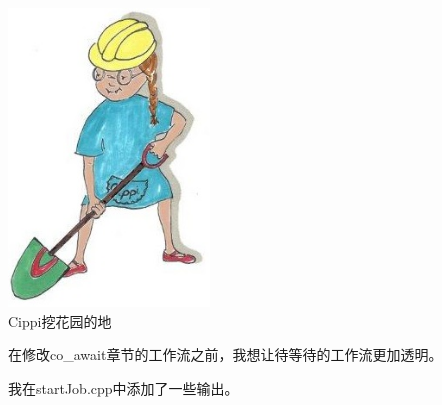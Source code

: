 \begin{center}
\includegraphics[width=0.4\textwidth]{content/3/chapter7/images/18.png}\\
Cippi挖花园的地
\end{center}

在修改co\_await章节的工作流之前，我想让待等待的工作流更加透明。



我在startJob.cpp中添加了一些输出。

